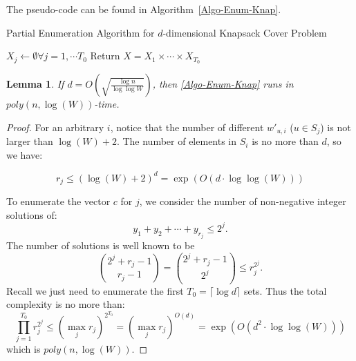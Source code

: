 \documentclass[11pt,a4paper]{article} \usepackage{enumitem}
\newtheorem{lemma}[theorem]{Lemma}
\theoremstyle{definition}
\begin{document}
The pseudo-code can be found in Algorithm~\ref{Algo-Enum-Knap}.
\begin{algorithm}
\caption{Partial Enumeration Algorithm for $d$-dimensional Knapsack Cover Problem} \label{Algo-Enum-Knap}
$X_j\gets \emptyset\forall j=1,\cdots T_0$\;
Return $X=X_1\times \cdots \times X_{T_0}$\;
\end{algorithm}


\begin{lemma}\label{lem:Knap-Enum-1}
If \(d = O\left(\sqrt{\frac{\log n}{\log\log W}}\right)\), then \cref{Algo-Enum-Knap} runs in \(poly(n, \log(W))\)-time.
\end{lemma}
\begin{proof}
For an arbitrary $i$, notice that the number of different $w'_{u,i}$ ($u\in S_j$) is not larger than \(\log(W) + 2\). The number of elements in $S_i$ is no more than $d$, so we have:

\[
r_j \le (\log(W) + 2)^d = \exp(O(d \cdot \log\log(W)))
\]

To enumerate the vector \(c\) for $j$, we consider the number of non-negative integer solutions of:
$$y_1+y_2+\cdots+y_{r_j}\leq 2^j.$$
The number of solutions is well known to be
$$\binom{2^j+r_j-1}{r_j-1}=\binom{2^j+r_j-1}{2^j}\leq r_j^{2^j}.$$
Recall we just need to enumerate the first \(T_0 = \lceil \log d \rceil\) sets. Thus the total complexity is no more than:
\[
\prod_{j=1}^{T_0} r_j^{2^j} \le (\max_{j} r_j)^{2^{T_0}} = (\max_{j} r_j)^{O(d)} = \exp(O(d^2 \cdot \log\log(W)))
\]
which is \(poly(n, \log(W))\).
\end{proof}
\end{document}
